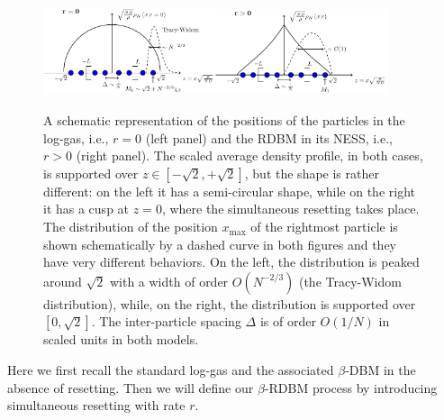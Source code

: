 \documentclass[onecolumn,superscriptaddress,
 amsmath,amssymb,
 aps,
 prd,
]{revtex4-1}
\begin{document}
\begin{figure}
\centering
\includegraphics[width = 0.45\textwidth]{free_gas.pdf}\hspace*{1.5cm}\includegraphics[width = 0.45\textwidth]{reset_gas.pdf}
\caption{A schematic representation of the positions of the particles in the log-gas, i.e., $r=0$ (left panel) and the RDBM in its NESS, i.e., $r>0$ (right panel). 
The scaled average density profile, in both cases, is supported over $z \in [-\sqrt{2},+\sqrt{2}]$, but the shape is rather different: 
on the left it has a semi-circular shape, while on the right it has a cusp at $z=0$, where the simultaneous resetting takes place. The distribution of the 
position $x_{\max}$ of the rightmost particle is shown schematically by a dashed curve in both figures and they have very different behaviors. On the left, the distribution is peaked around $\sqrt{2}$ with a width of order $O(N^{-2/3})$ (the Tracy-Widom distribution), while, on the right, the distribution is supported over $[0,\sqrt{2}]$. The inter-particle spacing $\Delta$ is of order $O(1/N)$ in scaled units in both models.} \label{fig:sketch}
\end{figure}



Here we first recall the standard log-gas and the associated $\beta$-DBM in the absence of resetting. Then we will define our $\beta$-RDBM process 
by introducing simultaneous resetting with rate $r$. 
\end{document}
